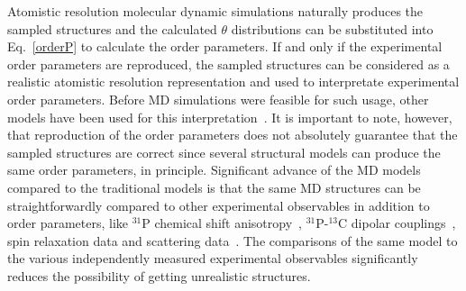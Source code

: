 \documentclass[aps,prl,superscriptaddress,twocolumn]{revtex4}
\begin{document}
Atomistic resolution molecular dynamic simulations naturally produces the
sampled structures and the calculated $\theta$ distributions can be substituted
into Eq.~\ref{orderP} to calculate the order parameters.
If and only if the experimental order parameters are
reproduced, the sampled structures can be considered as a realistic
atomistic resolution representation and used to interpretate experimental order parameters.
Before MD simulations were feasible for such usage, other models have been used for 
this interpretation~\cite{seelig74,gally75,seelig77,seelig78,jacobs81,davis83,bloom91,strenk85,baenziger91,hong95b,bruzik97}.
It is important to note, however, that reproduction of the order parameters does not absolutely 
guarantee that the sampled structures are correct since several structural models 
can produce the same order parameters, in principle. 
Significant advance of the MD models compared to the traditional models is that the same MD 
structures can be straightforwardly compared to other experimental observables in addition to order parameters, 
like $^{31}$P chemical shift anisotropy~\cite{chowdhary13}, $^{31}$P-$^{13}$C dipolar couplings~\cite{prakash10},
spin relaxation data \cite{ferreira15} and scattering data~\cite{kucerka10}. The comparisons
of the same model to the various independently measured experimental observables significantly reduces the 
possibility of getting unrealistic structures.
\end{document}
